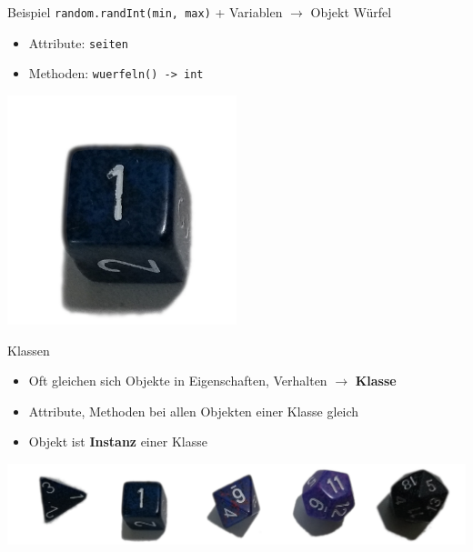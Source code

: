 \begin{frame}{Beispiel}
    \texttt{random.randInt(min, max)} + Variablen $\rightarrow$ Objekt \glqq Würfel\grqq \begin{itemize}
        \item Attribute: \texttt{seiten}
        \item Methoden: \texttt{wuerfeln() -> int}
    \end{itemize}
    \begin{center}
        \includegraphics[width=0.5\textwidth]{../images/d6.jpg}
    \end{center}
\end{frame}
\begin{frame}{Klassen}
    \begin{itemize}
        \item Oft gleichen sich Objekte in Eigenschaften, Verhalten $\rightarrow$ \textbf{Klasse}
        \item Attribute, Methoden bei allen Objekten einer Klasse gleich
        \item Objekt ist \textbf{Instanz} einer Klasse
    \end{itemize}
    \includegraphics[width=\textwidth]{../images/dice.jpg}
\end{frame}


